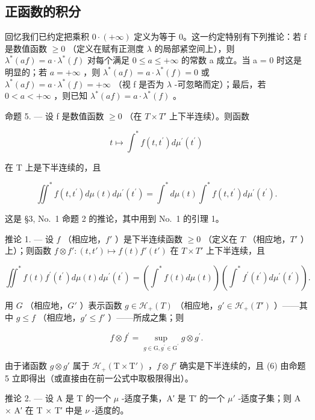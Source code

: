 \subsection{正函数的积分}

回忆我们已约定把乘积 \(0 \cdot (+\infty)\) 定义为等于 0。这一约定特别有下列推论：若 f 是数值函数 \(\geqslant 0\) （定义在赋有正测度 \(\lambda\) 的局部紧空间上），则 \(\lambda^{*}(af) = a \cdot \lambda^{*}(f)\) 对每个满足 \(0 \leqslant a \leqslant +\infty\) 的常数 a 成立。当 a = 0 时这是明显的；若 \(a = +\infty\) ，则 \(\lambda^{*}(af) = a \cdot \lambda^{*}(f) = 0\) 或 \(\lambda^{*}(af) = a \cdot \lambda^{*}(f) = +\infty\) （视 f 是否为 \(\lambda\) -可忽略而定）；最后，若 \(0 < a < +\infty\) ，则已知 \(\lambda^{*}(af) = a \cdot \lambda^{*}(f)\) 。

命题 5. --- 设 f 是数值函数 \(\geqslant 0\) （在 \(T \times T'\) 上下半连续）。则函数

\[
t \mapsto \int^ {*} f (t, t ^ {\prime}) d \mu^ {\prime} (t ^ {\prime})
\]

在 T 上是下半连续的，且

\[
\iint^ {*} f (t, t ^ {\prime}) d \mu (t) d \mu^ {\prime} (t ^ {\prime}) = \int^ {*} d \mu (t) \int^ {*} f (t, t ^ {\prime}) d \mu^ {\prime} (t ^ {\prime}).\tag{3}
\]

这是 §3, No.~1 命题 2 的推论，其中用到 No.~1 的引理 1。

推论 1. --- 设 \(f\) （相应地，\(f'\) ）是下半连续函数 \(\geqslant 0\) （定义在 \(T\) （相应地，\(T'\) ）上）；则函数 \(f \otimes f': (t, t') \mapsto f(t)f'(t')\) 在 \(T \times T'\) 上下半连续，且

\[
\iint^ {*} f (t) f ^ {\prime} \left(t ^ {\prime}\right) d \mu (t) d \mu^ {\prime} \left(t ^ {\prime}\right) = \left(\int^ {*} f (t) d \mu (t)\right) \left(\int^ {*} f ^ {\prime} \left(t ^ {\prime}\right) d \mu^ {\prime} \left(t ^ {\prime}\right)\right).\tag{6}
\]

用 \(G\) （相应地，\(G'\) ）表示函数 \(g \in \mathcal{H}_{+}(T)\) （相应地，\(g' \in \mathcal{H}_{+}(T')\) ）——其中 \(g \leqslant f\) （相应地，\(g' \leqslant f'\) ）——所成之集；则

\[
f \otimes f ^ {\prime} = \sup _ {g \in \mathrm{G}, g ^ {\prime} \in \mathrm{G} ^ {\prime}} g \otimes g ^ {\prime}.
\]

由于诸函数 \(g \otimes g'\) 属于 \(\mathcal{H}_{+}(\mathrm{T} \times \mathrm{T}')\) ，\(f \otimes f'\) 确实是下半连续的，且 (6) 由命题 5 立即得出（或直接由在前一公式中取极限得出）。

推论 2. --- 设 A 是 T 的一个 \(\mu\) -适度子集，A′ 是 T′ 的一个 \(\mu'\) -适度子集；则 A × A′ 在 T × T′ 中是 \(\nu\) -适度的。

